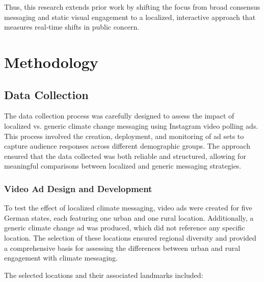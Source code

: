 \documentclass[a4paper,11pt]{article}
\begin{document}
Thus, this research extends prior work by shifting the focus from broad consensus messaging and static visual engagement to a localized, interactive approach that measures real-time shifts in public concern.


\section{Methodology}
\subsection{Data Collection}
The data collection process was carefully designed to assess the impact of localized vs. generic climate change messaging using Instagram video polling ads. This process involved the creation, deployment, and monitoring of ad sets to capture audience responses across different demographic groups. The approach ensured that the data collected was both reliable and structured, allowing for meaningful comparisons between localized and generic messaging strategies.

\subsubsection{Video Ad Design and Development}
To test the effect of localized climate messaging, video ads were created for five German states, each featuring one urban and one rural location. Additionally, a generic climate change ad was produced, which did not reference any specific location. The selection of these locations ensured regional diversity and provided a comprehensive basis for assessing the differences between urban and rural engagement with climate messaging.

The selected locations and their associated landmarks included:
\end{document}
